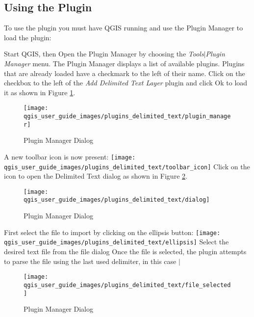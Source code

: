 \subsection{Using the Plugin}
To use the plugin you must have QGIS running and use the Plugin Manager to load the plugin:

Start QGIS, then Open the Plugin Manager by choosing the {\em Tools\mbox{$|$}Plugin Manager} menu. The Plugin Manager displays a list of available plugins. Plugins that are already loaded have a checkmark to the left of their name. Click on the checkbox to the left of the {\em Add Delimited Text Layer} plugin and click Ok to load it as shown in Figure \ref{fig:plugin_manager}.

\begin{figure}[h]
   \begin{center}
   \caption{Plugin Manager Dialog}
   \label{fig:plugin_manager}
   \smallskip
   \texttt{[image: qgis\_user\_guide\_images/plugins\_delimited\_text/plugin\_manager]}
   \end{center}  
\end{figure}


A new toolbar icon is now present:
\texttt{[image: qgis\_user\_guide\_images/plugins\_delimited\_text/toolbar\_icon]}
Click on the icon to open the Delimited Text dialog as shown in Figure \ref{fig:delim_text_plugin_dialog}.

\begin{figure}[h]
   \begin{center}
   \caption{Plugin Manager Dialog}\label{fig:delim_text_plugin_dialog}\smallskip
   \texttt{[image: qgis\_user\_guide\_images/plugins\_delimited\_text/dialog]}            
   \end{center}  
\end{figure}

  
First select the file to import by clicking on the ellipsis button: 
\texttt{[image: qgis\_user\_guide\_images/plugins\_delimited\_text/ellipsis]}
Select the desired text file from the file dialog
Once the file is selected, the plugin attempts to parse the file using the last used delimiter, in this case \mbox{$|$}
\begin{figure}[h]
   \begin{center}
   \caption{Plugin Manager Dialog}\label{fig:delim_text_file_selected}\smallskip
   \texttt{[image: qgis\_user\_guide\_images/plugins\_delimited\_text/file\_selected]}   
   \end{center}  
\end{figure}

